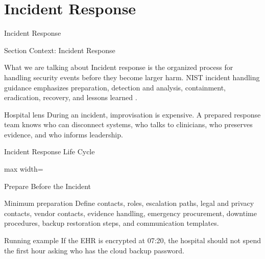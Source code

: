 \documentclass[presentation]{beamer}
\newcommand{\sectiontitleframe}[1]{
\begin{frame}[plain,c]
\begin{center}
{\usebeamerfont{title}\usebeamercolor[fg]{title}#1}
\end{center}
\end{frame}
}
\begin{document}
\section{Incident Response}
\sectiontitleframe{Incident Response}

\begin{frame}[c]{Section Context: Incident Response}
\begin{block}{What we are talking about}
Incident response is the organized process for handling security events before they become larger
harm. NIST incident handling guidance emphasizes preparation, detection and analysis, containment,
eradication, recovery, and lessons learned \cite{nist_ir}.
\end{block}

\begin{exampleblock}{Hospital lens}
During an incident, improvisation is expensive. A prepared response team knows who can disconnect
systems, who talks to clinicians, who preserves evidence, and who informs leadership.
\end{exampleblock}
\end{frame}

\begin{frame}[c]{Incident Response Life Cycle}
\begin{center}
\begin{adjustbox}{max width=\textwidth}
\end{adjustbox}
\end{center}
\end{frame}

\begin{frame}[c]{Prepare Before the Incident}
\begin{block}{Minimum preparation}
Define contacts, roles, escalation paths, legal and privacy contacts, vendor contacts, evidence
handling, emergency procurement, downtime procedures, backup restoration steps, and communication
templates.
\end{block}

\begin{exampleblock}{Running example}
If the EHR is encrypted at 07:20, the hospital should not spend the first hour asking who has the
cloud backup password.
\end{exampleblock}
\end{frame}
\end{document}
